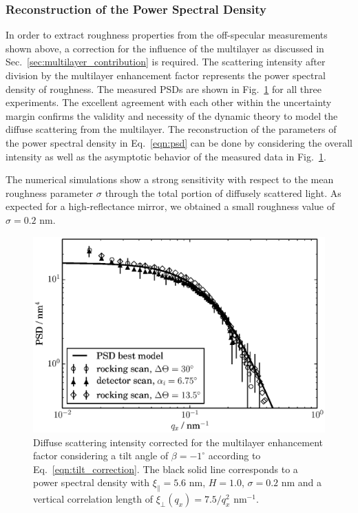 \subsubsection{Reconstruction of the Power Spectral Density} \label{sec:determination_of_the_psd} In order to extract roughness properties from the off-specular measurements shown above, a correction for the influence of the multilayer as discussed in Sec.~\ref{sec:multilayer_contribution} is required. The scattering intensity after division by the multilayer enhancement factor represents the power spectral density of roughness. The measured PSDs are shown in Fig.~\ref{fig:PSDs_linear} for all three experiments. The excellent agreement with each other within the uncertainty margin confirms the validity and necessity of the dynamic theory to model the diffuse scattering from the multilayer. The reconstruction of the parameters of the power spectral density in Eq.~\eqref{eqn:psd} can be done by considering the overall intensity as well as the asymptotic behavior \cite{salditt_interfacial_1996} of the measured data in Fig.~\ref{fig:PSDs_linear}.

The numerical simulations show a strong sensitivity with respect to the mean roughness parameter $\sigma$ through the total portion of diffusely scattered light. As expected for a high-reflectance mirror, we obtained a small roughness value of $\sigma = 0.2$ nm.
\begin{figure}[htbp]
	\includegraphics[width=0.7
	\textwidth]{images/PSD_zoomed} \caption{Diffuse scattering intensity corrected for the multilayer enhancement factor considering a tilt angle of $\beta=-1^{\circ}$ according to Eq.~\eqref{eqn:tilt_correction}. The black solid line corresponds to a power spectral density with $\xi_\parallel=5.6$ nm, $H=1.0$, $\sigma=0.2$ nm and a vertical correlation length of $\xi_\perp(q_x)=7.5/q_x^2$ nm$^{-1}$.} \label{fig:PSDs_linear} 
\end{figure}

